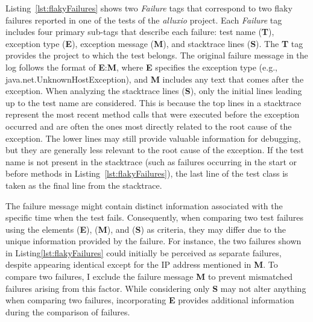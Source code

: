 
Listing~\ref{lst:flakyFailures} shows two \emph{Failure} tags that correspond to two flaky failures reported in one of the tests of the \emph{alluxio} project. Each \emph{Failure} tag includes four primary sub-tags that describe each failure: test name (\textbf{T}), exception type (\textbf{E}), exception message (\textbf{M}), and stacktrace lines (\textbf{S}). The \textbf{T} tag provides the project to which the test belongs. The original failure message in the log follows the format of \textbf{E}:\textbf{M}, where \textbf{E} specifies the exception type (e.g., java.net.UnknownHostException), and \textbf{M} includes any text that comes after the exception. When analyzing the stacktrace lines (\textbf{S}), only the initial lines leading up to the test name are considered. This is because the top lines in a stacktrace represent the most recent method calls that were executed before the exception occurred and are often the ones most directly related to the root cause of the exception. The lower lines may still provide valuable information for debugging, but they are generally less relevant to the root cause of the exception. If the test name is not present in the stacktrace (such as failures occurring in the start or before methods in Listing~\ref{lst:flakyFailures}), the last line of the test class is taken as the final line from the stacktrace.


The failure message might contain distinct information associated with the specific time when the test fails. Consequently, when comparing two test failures using the elements (\textbf{E}), (\textbf{M}), and (\textbf{S}) as criteria, they may differ due to the unique information provided by the failure. For instance, the two failures shown in Listing\ref{lst:flakyFailures} could initially be perceived as separate failures, despite appearing identical except for the IP address mentioned in \textbf{M}. To compare two failures, I exclude the failure message \textbf{M} to prevent mismatched failures arising from this factor. While considering only \textbf{S} may not alter anything when comparing two failures, incorporating \textbf{E} provides additional information during the comparison of failures.





